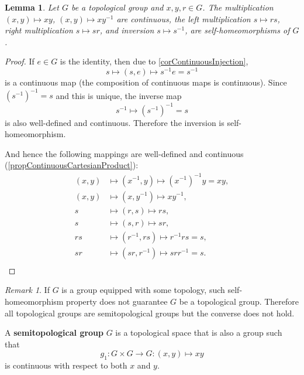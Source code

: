 \documentclass[12pt, letterpaper]{article}
\newtheorem{lem}[prop]{Lemma}
\theoremstyle{definition}
\theoremstyle{remark}
\newtheorem*{rem*}{Remark}
\theoremstyle{definition}
\theoremstyle{plain}
\numberwithin{equation}{section}
\begin{document}
	\begin{lem}\label{lemTopGrpHomeo}
		Let $G$	be a topological group and 
		$x,y,r\in G$.
		The multiplication $(x,y)\mapsto xy$, $(x,y)\mapsto xy^{-1}$ are continuous,
		the left multiplication $s\mapsto rs$,
		right multiplication $s\mapsto sr$, and inversion $s\mapsto s^{-1}$, are self-homeomorphisms of 
		$G$.
		
	\end{lem}
	\begin{proof}
		If $e\in G$ is the identity, then due to \ref{corContinuousInjection},
		\[ s\mapsto (s,e)\mapsto s^{-1}e=s^{-1} \]
		is a continuous map (the composition of continuous maps is continuous).
		Since $(s^{-1})^{-1}=s$ and this is unique, the inverse map
		\[ s^{-1}\mapsto (s^{-1})^{-1}=s \]
		is also well-defined and continuous. Therefore the inversion is self-homeomorphism.
		
		And hence the following mappings are well-defined and continuous (\ref{propContinuousCartesianProduct}):
		\[\begin{aligned}
			(x,y)&\mapsto (x^{-1},y) \mapsto (x^{-1})^{-1}y=xy, \\
			(x,y)&\mapsto (x,y^{-1}) \mapsto xy^{-1}, \\
			s&\mapsto (r,s)\mapsto rs,\\
			s&\mapsto (s,r)\mapsto sr,\\
			rs&\mapsto (r^{-1},rs)\mapsto r^{-1}rs=s,\\
			sr&\mapsto(sr,r^{-1})\mapsto srr^{-1}=s.\\
		\end{aligned} \]
	\end{proof}
	\begin{rem*}
		If $G$ is a group equipped with some topology, such self-homeomorphism property does not guarantee $G$ be a topological group.
		Therefore all topological groups are semitopological groups but the converse does not hold.
	\end{rem*}
	\begin{def*}
		A \textbf{semitopological group} $G$ is a topological space that is also a group such that
		\[g_{1}:G\times G\to G:(x,y)\mapsto xy\]
		is continuous with respect to both $x$ and $y$.
	\end{def*}
\end{document}
